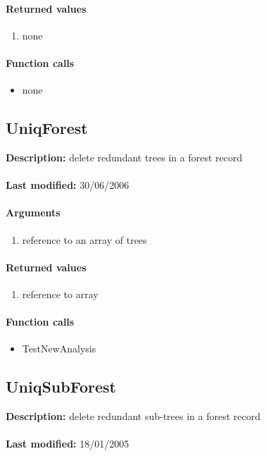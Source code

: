 \paragraph{Returned values}
\begin{enumerate}
\item none
\end{enumerate}

\paragraph{Function calls}
\begin{itemize}
\item none
\end{itemize}

\subsection{UniqForest}
\textbf{Description:} delete redundant trees in a forest record\\
\\\textbf{Last modified:} 30/06/2006

\paragraph{Arguments}
\begin{enumerate}
\item reference to an array of trees
\end{enumerate}

\paragraph{Returned values}
\begin{enumerate}
\item reference to array
\end{enumerate}

\paragraph{Function calls}
\begin{itemize}
\item TestNewAnalysis
\end{itemize}

\subsection{UniqSubForest}
\textbf{Description:} delete redundant sub-trees in a forest record\\
\\\textbf{Last modified:} 18/01/2005

